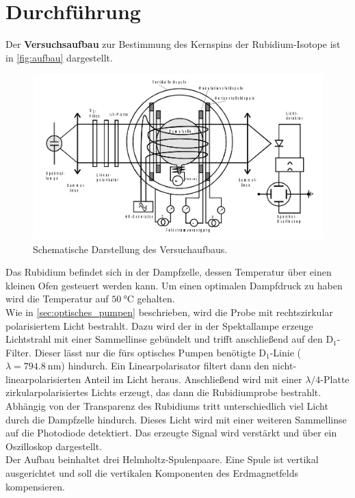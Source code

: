 \section{Durchführung}
\label{sec:Durchführung}
Der \textbf{Versuchsaufbau} zur Bestimmung des Kernspins der Rubidium-Isotope ist in \autoref{fig:aufbau} dargestellt.
\begin{figure}
    \centering
    \includegraphics[width=\textwidth]{content/img/aufbau.png}
    \caption{Schematische Darstellung des Versuchaufbaus. \cite{anleitung}}
    \label{fig:aufbau}
\end{figure}
Das Rubidium befindet sich in der Dampfzelle, dessen Temperatur über einen kleinen Ofen gesteuert werden kann.
Um einen optimalen Dampfdruck zu haben wird die Temperatur auf $\qty{50}{\degreeCelsius}$ gehalten.
\\
Wie in \autoref{sec:optisches_pumpen} beschrieben, wird die Probe mit rechtszirkular polarisiertem Licht bestrahlt.
Dazu wird der in der Spektallampe erzeuge Lichtstrahl mit einer Sammellinse gebündelt und trifft anschließend auf den $\text{D}_1$-Filter.
Dieser lässt nur die fürs optisches Pumpen benötigte $\text{D}_1$-Linie ($\lambda = \qty{794.8}{\nano\metre}$) hindurch.
Ein Linearpolarisator filtert dann den nicht-linearpolarisierten Anteil im Licht heraus.
Anschließend wird mit einer $\lambda / 4$-Platte zirkularpolarisiertes Lichts erzeugt, das dann die Rubidiumprobe bestrahlt.
\\
Abhängig von der Transparenz des Rubidiums tritt unterschiedlich viel Licht durch die Dampfzelle hindurch.
Dieses Licht wird mit einer weiteren Sammellinse auf die Photodiode detektiert.
Das erzeugte Signal wird verstärkt und über ein Oszilloskop dargestellt.
\\
Der Aufbau beinhaltet drei Helmholtz-Spulenpaare.
Eine Spule ist vertikal ausgerichtet und soll die vertikalen Komponenten des Erdmagnetfelds kompensieren.
